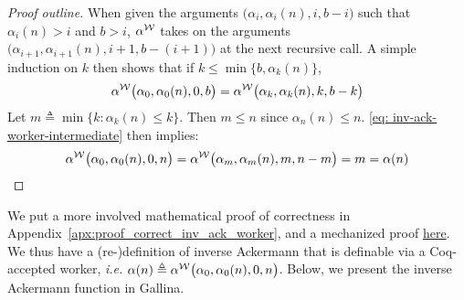\begin{proof}[Proof outline]
	When given the arguments $\big(\alpha_i, \alpha_i(n), i, b - i\big)$ such that $\alpha_i(n) > i$ and $b > i$, $\alpha^{\mathcal{W}}$ takes on the arguments $\big(\alpha_{i+1}, \alpha_{i+1}(n), i+1, b - (i+1)\big)$ at the next recursive call. A simple induction on $k$ then shows that if $k\le \min\big\{b, \alpha_k(n)\big\}$,
	\begin{equation} \label{eq: inv-ack-worker-intermediate}
	\alpha^{\mathcal{W}}\big(\alpha_0, \alpha_0(n), 0, b\big) = \alpha^{\mathcal{W}}\big(\alpha_k, \alpha_k(n), k, b-k\big)
	\end{equation}
	Let $m \triangleq \min\big\{k : \alpha_k(n) \le k \}$. Then $m\le n$ since $\alpha_n(n)\le n$. \eqref{eq: inv-ack-worker-intermediate} then implies:
	$$ \alpha^{\mathcal{W}}\big(\alpha_0, \alpha_0(n), 0, n\big) = \alpha^{\mathcal{W}}\big(\alpha_m, \alpha_m(n), m, n - m\big) = m = \alpha(n) $$
\end{proof}
\noindent We put a more involved mathematical proof of correctness in Appendix~\ref{apx:proof_correct_inv_ack_worker}, and a mechanized proof
	\href{https://github.com/inv-ack/inv-ack/blob/7270e64a2600b771f2b1b1b151f7d13fb2ae6c97/inv_ack.v#L163-L231}{\color{blue}here}.
We thus have a (re-)definition of inverse Ackermann that is %
definable via a Coq-accepted worker, \emph{i.e.} $\alpha(n) \triangleq \alpha^{\mathcal{W}}\big(\alpha_0, \alpha_0(n), 0, n\big)$. Below, we present the inverse
Ackermann function in Gallina.


